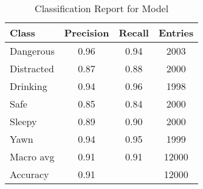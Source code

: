 \documentclass{article}
\begin{document}
\begin{table}[htbp]
    \centering
    \caption{Classification Report for Model}
    \vspace{3pt}
    \label{tab:classification_report_model}
    \begin{adjustbox}{max width=\textwidth}
    \begin{tabular}{l|cc|c}
        \toprule
        \textbf{Class} & \textbf{Precision} & \textbf{Recall} & \textbf{Entries} \\
        \midrule
        Dangerous & 0.96 & 0.94 & 2003 \\
        Distracted & 0.87 & 0.88 & 2000 \\
        Drinking & 0.94 & 0.96 & 1998 \\
        Safe & 0.85 & 0.84 & 2000 \\
        Sleepy & 0.89 & 0.90 & 2000 \\
        Yawn & 0.94 & 0.95 & 1999 \\
        \midrule
        Macro avg & 0.91 & 0.91& 12000 \\
        Accuracy & 0.91 & \phantom{0} & 12000 \\
        \bottomrule
    \end{tabular}
    \end{adjustbox}
\end{table}
\end{document}
